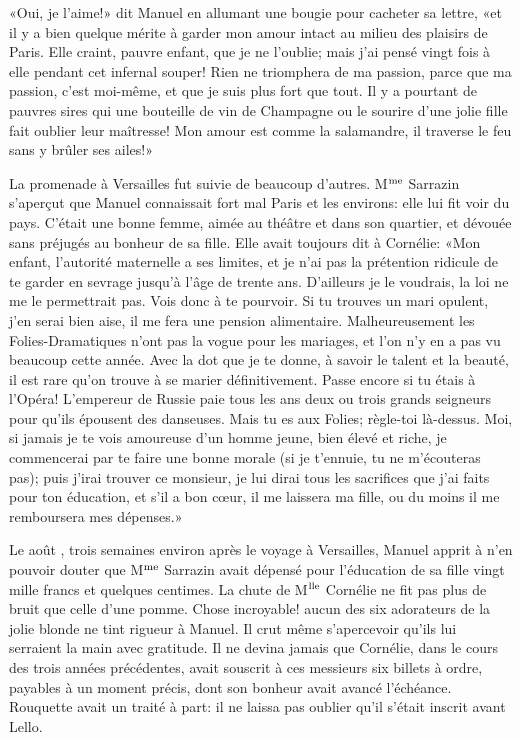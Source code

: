 «Oui, je l'aime!» dit Manuel en allumant une bougie pour cacheter sa lettre, «et il y a bien quelque mérite à garder mon amour intact au milieu des plaisirs de Paris. Elle craint, pauvre enfant, que je ne l'oublie; mais j'ai pensé vingt fois à elle pendant cet infernal souper! Rien ne triomphera de ma passion, parce que ma passion, c'est moi-même, et que je suis plus fort que tout. Il y a pourtant de pauvres sires qui une bouteille de vin de Champagne ou le sourire d'une jolie fille fait oublier leur maîtresse! Mon amour est comme la salamandre, il traverse le feu sans y brûler ses ailes!»

La promenade à Versailles fut suivie de beaucoup d'autres. M$\textsuperscript{me}$ Sarrazin s'aperçut que Manuel connaissait fort mal Paris et les environs: elle lui fit voir du pays. C'était une bonne femme, aimée au théâtre et dans son quartier, et dévouée sans préjugés au bonheur de sa fille. Elle avait toujours dit à Cornélie: «Mon enfant, l'autorité maternelle a ses limites, et je n'ai pas la prétention ridicule de te garder en sevrage jusqu'à l'âge de trente ans. D'ailleurs je le voudrais, la loi ne me le permettrait pas. Vois donc à te pourvoir. Si tu trouves un mari opulent, j'en serai bien aise, il me fera une pension alimentaire. Malheureusement les Folies-Dramatiques n'ont pas la vogue pour les mariages, et l'on n'y en a pas vu beaucoup cette année. Avec la dot que je te donne, à savoir le talent et la beauté, il est rare qu'on trouve à se marier définitivement. Passe encore si tu étais à l'Opéra! L'empereur de Russie paie tous les ans deux ou trois grands seigneurs pour qu'ils épousent des danseuses. Mais tu es aux Folies; règle-toi là-dessus. Moi, si jamais je te vois amoureuse d'un homme jeune, bien élevé et riche, je commencerai par te faire une bonne morale (si je t'ennuie, tu ne m'écouteras pas); puis j'irai trouver ce monsieur, je lui dirai tous les sacrifices que j'ai faits pour ton éducation, et s'il a bon c\oe{}ur, il me laissera ma fille, ou du moins il me remboursera mes dépenses.»

Le  août , trois semaines environ après le voyage à Versailles, Manuel apprit à n'en pouvoir douter que M$\textsuperscript{me}$ Sarrazin avait dépensé pour l'éducation de sa fille vingt mille francs et quelques centimes. La chute de M$\textsuperscript{lle}$ Cornélie ne fit pas plus de bruit que celle d'une pomme. Chose incroyable! aucun des six adorateurs de la jolie blonde ne tint rigueur à Manuel. Il crut même s'apercevoir qu'ils lui serraient la main avec gratitude. Il ne devina jamais que Cornélie, dans le cours des trois années précédentes, avait souscrit à ces messieurs six billets à ordre, payables à un moment précis, dont son bonheur avait avancé l'échéance. Rouquette avait un traité à part: il ne laissa pas oublier qu'il s'était inscrit avant Lello.


